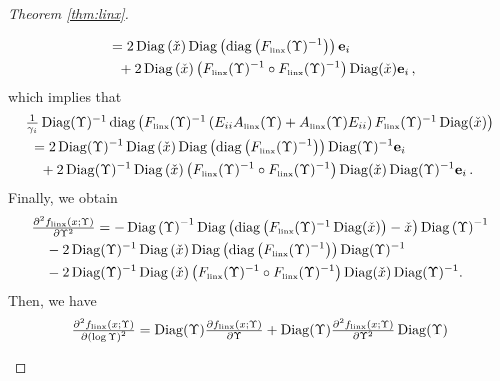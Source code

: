 \documentclass[smallextended]{svjour3hack}       %
\DeclareMathOperator{\Diag}{Diag}
\DeclareMathOperator{\diag}{diag}
\begin{document}
\begin{proof}[Theorem \ref{thm:linx}]
\begin{itemize}
\begin{align*}
     &~= 2 \Diag\left(\check{x}\right) \Diag\left(\diag\left(F_{{\tiny\mbox{linx}}}(\Upsilon)^{-1}\right)\right) \mathbf{e}_i\\
     & \quad + 2 \Diag\left(\check{x}\right)   \left(F_{{\tiny\mbox{linx}}}(\Upsilon)^{-1}\circ F_{{\tiny\mbox{linx}}}(\Upsilon)^{-1}\right) \Diag(\check{x}) \mathbf{e}_i\,,
 \end{align*}
    which implies that
    \begin{align*}
        &\textstyle\frac{1}{\gamma_i}\Diag(\Upsilon)^{-1}\diag\left(F_{{\tiny\mbox{linx}}}(\Upsilon)^{-1}\left(E_{ii}A_{{\tiny\mbox{linx}}}(\Upsilon)+A_{{\tiny\mbox{linx}}}(\Upsilon) E_{ii}\right)
    F_{{\tiny\mbox{linx}}}(\Upsilon)^{-1}\Diag(\check{x})\right)\\
    & ~=2 \Diag(\Upsilon)^{-1} \Diag\left(\check{x}\right) \Diag\left(\diag\left(F_{{\tiny\mbox{linx}}}(\Upsilon)^{-1}\right)\right) \Diag(\Upsilon)^{-1}\mathbf{e}_i \\
    & \quad  +2 \Diag(\Upsilon)^{-1} \Diag\left(\check{x}\right)   \left(F_{{\tiny\mbox{linx}}}(\Upsilon)^{-1}\circ F_{{\tiny\mbox{linx}}}(\Upsilon)^{-1}\right) \Diag(\check{x})\Diag(\Upsilon)^{-1}\mathbf{e}_i\,.
    \end{align*}
    Finally, we obtain
    \begin{align*}
        &\textstyle\frac{\partial^2 f_{{\tiny\mbox{linx}}}\left(x;\Upsilon\right)}{\partial \Upsilon ^2 }
         =-  \Diag\left(\Upsilon\right)^{-1} \Diag\left(\diag\left(F_{{\tiny\mbox{linx}}}(\Upsilon)^{-1}\Diag(\check{x})\right)-\check{x}\right) \Diag\left(\Upsilon\right)^{-1}   \\
        & \quad - 2 \Diag(\Upsilon)^{-1} \Diag\left(\check{x}\right) \Diag\left(\diag\left(F_{{\tiny\mbox{linx}}}(\Upsilon)^{-1}\right)\right) \Diag(\Upsilon)^{-1} \\
        &\quad -2 \Diag(\Upsilon)^{-1} \Diag\left(\check{x}\right)   \left(F_{{\tiny\mbox{linx}}}(\Upsilon)^{-1}\circ F_{{\tiny\mbox{linx}}}(\Upsilon)^{-1}\right)  \Diag(\check{x}) \Diag(\Upsilon)^{-1}.
    \end{align*}
   Then, we have
    \begin{align*}
        &\textstyle\frac{\partial^2 f_{{\tiny\mbox{linx}}}\left(x;\Upsilon\right)}{\partial \left(\log \Upsilon\right) ^2} = \Diag(\Upsilon) \textstyle\frac{\partial f_{{\tiny\mbox{linx}}}\left(x;\Upsilon\right)}{\partial \Upsilon } + \Diag(\Upsilon)\frac{\partial^2 f_{{\tiny\mbox{linx}}}\left(x;\Upsilon\right)}{\partial \Upsilon ^2 } \Diag(\Upsilon)\\

\end{align*}
\end{itemize}
\end{proof}
\end{document}
